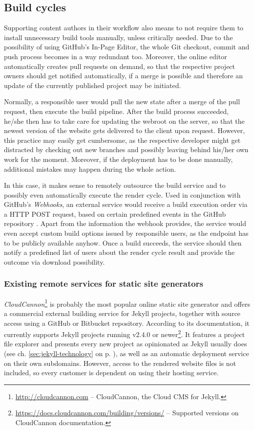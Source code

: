 \subsection{Build cycles}
\label{sec:solutions-remotebuilding}

Supporting content authors in their workflow also means to not require them to install unnecessary build tools manually, unless critically needed. Due to the possibility of using GitHub's In-Page Editor, the whole Git checkout, commit and push process becomes in a way redundant too. Moreover, the online editor automatically creates pull requests on demand, so that the respective project owners should get notified automatically, if a merge is possible and therefore an update of the currently published project may be initiated.

Normally, a responsible user would pull the new state after a merge of the pull request, then execute the build pipeline. After the build process succeeded, he/she then has to take care for updating the webroot on the server, so that the newest version of the website gets delivered to the client upon request. However, this practice may easily get cumbersome, as the respective developer might get distracted by checking out new branches and possibly leaving behind his/her own work for the moment. Moreover, if the deployment has to be done manually, additional mistakes may happen during the whole action.

In this case, it makes sense to remotely outsource the build service and to possibly even automatically execute the render cycle. Used in conjunction with GitHub's \emph{Webhooks}, an external service would receive a build execution order via a HTTP POST request, based on certain predefined events in the GitHub repository \cite{GithubWebhooks}. Apart from the information the webhook provides, the service would even accept custom build options issued by responsible users, as the endpoint has to be publicly available anyhow. Once a build succeeds, the service should then notify a predefined list of users about the render cycle result and provide the outcome via download possibility.

\subsubsection{Existing remote services for static site generators}
\emph{CloudCannon}\footnote{\url{http://cloudcannon.com} -- CloudCannon, the Cloud CMS for Jekyll.} is probably the most popular online static site generator and offers a commercial external building service for Jekyll projects, together with source access using a GitHub or Bitbucket repository. According to its documentation, it currently supports Jekyll projects running v2.4.0 or newer\footnote{\url{https://docs.cloudcannon.com/building/versions/} -- Supported versions on CloudCannon documentation.}. It features a project file explorer and presents every new project as opinionated as Jekyll usually does (see ch. \ref{sec:jekyll-technology} on p. \pageref{sec:jekyll-technology}), as well as an automatic deployment service on their own subdomains. However, access to the rendered website files is not included, so every customer is dependent on using their hosting service.

